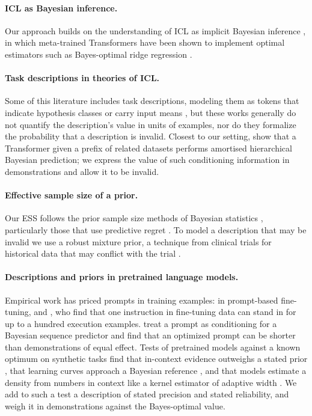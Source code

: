 \documentclass[10pt,twocolumn]{article}
\begin{document}
\paragraph{ICL as Bayesian inference.} Our approach builds on the understanding of ICL as implicit Bayesian inference \citep{xie2022}, in which meta-trained Transformers have been shown to implement optimal estimators such as Bayes-optimal ridge regression \citep{akyurek2023, raventos2023, panwar2024}.

\paragraph{Task descriptions in theories of ICL.} Some of this literature includes task descriptions, modeling them as tokens that indicate hypothesis classes or carry input means \citep{huangge2025, lin2025, tong2026, lin2024}, but these works generally do not quantify the description's value in units of examples, nor do they formalize the probability that a description is invalid. Closest to our setting, \citet{zhu2026} show that a Transformer given a prefix of related datasets performs amortised hierarchical Bayesian prediction; we express the value of such conditioning information in demonstrations and allow it to be invalid.

\paragraph{Effective sample size of a prior.} Our ESS follows the prior sample size methods of Bayesian statistics \citep{morita2008, reimherr2021, neuenschwander2020}, particularly those that use predictive regret \citep{reznik2026}. To model a description that may be invalid we use a robust mixture prior, a technique from clinical trials for historical data that may conflict with the trial \citep{schmidli2014}.

\paragraph{Descriptions and priors in pretrained language models.} Empirical work has priced prompts in training examples: \citet{lescao2021} in prompt-based fine-tuning, and \citet{cook2026}, who find that one instruction in fine-tuning data can stand in for up to a hundred execution examples. \citet{wenliang2025} treat a prompt as conditioning for a Bayesian sequence predictor and find that an optimized prompt can be shorter than demonstrations of equal effect. Tests of pretrained models against a known optimum on synthetic tasks find that in-context evidence outweighs a stated prior \citep{gupta2025}, that learning curves approach a Bayesian reference \citep{akata2026}, and that models estimate a density from numbers in context like a kernel estimator of adaptive width \citep{liu2025}. We add to such a test a description of stated precision and stated reliability, and weigh it in demonstrations against the Bayes-optimal value.
\end{document}
